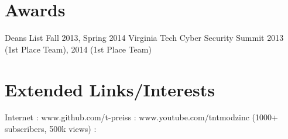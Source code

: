 \documentclass{tpreiss_cv}
\begin{document}
\section{Awards}
Deans List Fall 2013, Spring 2014                  
Virginia Tech Cyber Security Summit 2013 (1st Place Team), 2014 (1st Place Team)

\section{Extended Links/Interests}

Internet : www.github.com/t-preiss  :  www.youtube.com/tntmodzinc  (1000+ subscribers, 500k views) :
\end{document}
